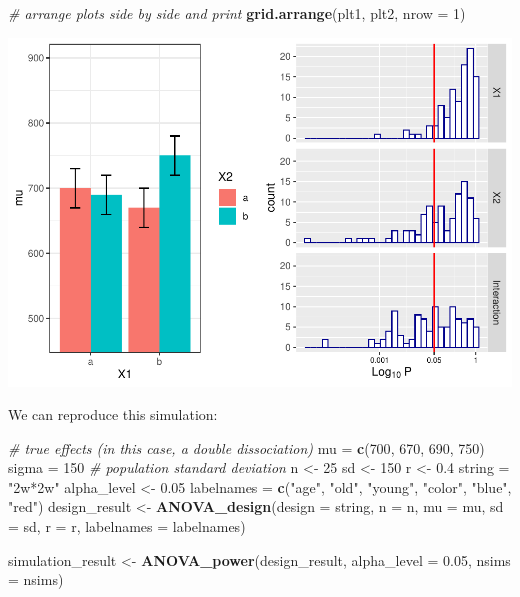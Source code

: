 \documentclass[]{book}
\newenvironment{Shaded}{\begin{snugshade}}{\end{snugshade}}
\newcommand{\CommentTok}[1]{\textcolor[rgb]{0.56,0.35,0.01}{\textit{#1}}}
\newcommand{\DataTypeTok}[1]{\textcolor[rgb]{0.13,0.29,0.53}{#1}}
\newcommand{\DecValTok}[1]{\textcolor[rgb]{0.00,0.00,0.81}{#1}}
\newcommand{\FloatTok}[1]{\textcolor[rgb]{0.00,0.00,0.81}{#1}}
\newcommand{\KeywordTok}[1]{\textcolor[rgb]{0.13,0.29,0.53}{\textbf{#1}}}
\newcommand{\NormalTok}[1]{#1}
\newcommand{\StringTok}[1]{\textcolor[rgb]{0.31,0.60,0.02}{#1}}
\begin{document}
\begin{Shaded}
\begin{Highlighting}[]
\CommentTok{# arrange plots side by side and print}
\KeywordTok{grid.arrange}\NormalTok{(plt1, plt2, }\DataTypeTok{nrow =} \DecValTok{1}\NormalTok{)}
\end{Highlighting}
\end{Shaded}

\includegraphics{SuperpowerValidation_files/figure-latex/unnamed-chunk-118-1.pdf}

We can reproduce this simulation:

\begin{Shaded}
\begin{Highlighting}[]
\CommentTok{# true effects (in this case, a double dissociation)}
\NormalTok{mu =}\StringTok{ }\KeywordTok{c}\NormalTok{(}\DecValTok{700}\NormalTok{, }\DecValTok{670}\NormalTok{, }\DecValTok{690}\NormalTok{, }\DecValTok{750}\NormalTok{) }
\NormalTok{sigma =}\StringTok{ }\DecValTok{150}  \CommentTok{# population standard deviation}
\NormalTok{n <-}\StringTok{ }\DecValTok{25}
\NormalTok{sd <-}\StringTok{ }\DecValTok{150}
\NormalTok{r <-}\StringTok{ }\FloatTok{0.4}
\NormalTok{string =}\StringTok{ "2w*2w"}
\NormalTok{alpha_level <-}\StringTok{ }\FloatTok{0.05}
\NormalTok{labelnames =}\StringTok{ }\KeywordTok{c}\NormalTok{(}\StringTok{"age"}\NormalTok{, }\StringTok{"old"}\NormalTok{, }\StringTok{"young"}\NormalTok{, }\StringTok{"color"}\NormalTok{, }\StringTok{"blue"}\NormalTok{, }\StringTok{"red"}\NormalTok{)}
\NormalTok{design_result <-}\StringTok{ }\KeywordTok{ANOVA_design}\NormalTok{(}\DataTypeTok{design =}\NormalTok{ string,}
                              \DataTypeTok{n =}\NormalTok{ n, }
                              \DataTypeTok{mu =}\NormalTok{ mu, }
                              \DataTypeTok{sd =}\NormalTok{ sd, }
                              \DataTypeTok{r =}\NormalTok{ r, }
                              \DataTypeTok{labelnames =}\NormalTok{ labelnames)}

\NormalTok{simulation_result <-}\StringTok{ }\KeywordTok{ANOVA_power}\NormalTok{(design_result, }
                                 \DataTypeTok{alpha_level =} \FloatTok{0.05}\NormalTok{, }
                                 \DataTypeTok{nsims =}\NormalTok{ nsims)}
\end{Highlighting}
\end{Shaded}
\end{document}
